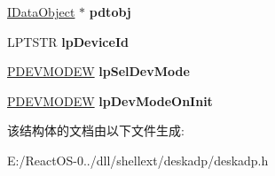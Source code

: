 \begin{DoxyCompactItemize}
\item 
\mbox{\label{struct___d_e_s_k_d_i_s_p_l_a_y_a_d_a_p_t_e_r_ae597d8af8ed41cc9b7b83396d17bb370}} 
\hyperlink{interface_i_data_object}{I\+Data\+Object} $\ast$ {\bfseries pdtobj}
\item 
\mbox{\label{struct___d_e_s_k_d_i_s_p_l_a_y_a_d_a_p_t_e_r_a1d605f481c816affa1dd3579dab041d8}} 
L\+P\+T\+S\+TR {\bfseries lp\+Device\+Id}
\item 
\mbox{\label{struct___d_e_s_k_d_i_s_p_l_a_y_a_d_a_p_t_e_r_aaacfd4f22173a741b3d4a599ef660c01}} 
\hyperlink{struct__devicemode_w}{P\+D\+E\+V\+M\+O\+D\+EW} {\bfseries lp\+Sel\+Dev\+Mode}
\item 
\mbox{\label{struct___d_e_s_k_d_i_s_p_l_a_y_a_d_a_p_t_e_r_a36eddbb7ca798fd6a6e944de304a2ce3}} 
\hyperlink{struct__devicemode_w}{P\+D\+E\+V\+M\+O\+D\+EW} {\bfseries lp\+Dev\+Mode\+On\+Init}
\end{DoxyCompactItemize}


该结构体的文档由以下文件生成\+:\begin{DoxyCompactItemize}
\item 
E\+:/\+React\+O\+S-\/0../dll/shellext/deskadp/deskadp.\+h\end{DoxyCompactItemize}
